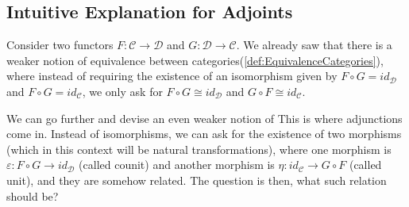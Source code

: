 \subsection{Intuitive Explanation for Adjoints}

Consider two functors $F:\mathcal C \to \mathcal D$ and $G:\mathcal D \to \mathcal C$.
We already saw that there is a weaker notion
of equivalence between categories(\ref{def:EquivalenceCategories}), where instead of
requiring the existence of an isomorphism given by
$F \circ G = id_\mathcal D$ and $F \circ G = id_\mathcal C$, we only
ask for $F \circ G \cong id_\mathcal D$ and $G \circ F \cong id_\mathcal C$.

We can go further and devise an even weaker notion of 
This is where adjunctions come in. Instead
of isomorphisms, we can ask for the existence of two morphisms
(which in this context will be natural transformations),
where one morphism is $\varepsilon:F\circ G \to id_\mathcal D$ (called counit) and another morphism
is $\eta:id_\mathcal C \to G\circ F $ (called unit), and they are somehow related. The question is
then, what such relation should be?





